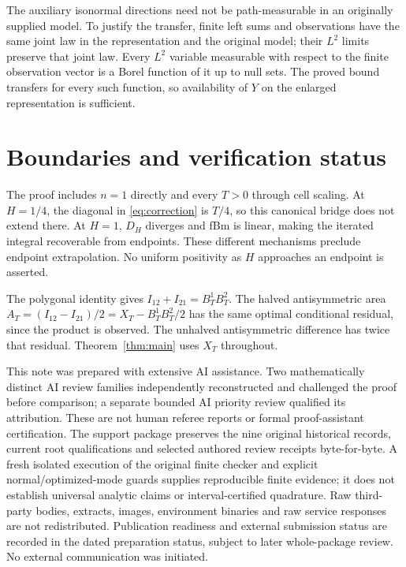 \documentclass[11pt]{article}
\begin{document}
The auxiliary isonormal directions need not be path-measurable in an originally supplied model. To justify the transfer, finite left sums and observations have the same joint law in the representation and the original model; their $L^2$ limits preserve that joint law. Every $L^2$ variable measurable with respect to the finite observation vector is a Borel function of it up to null sets. The proved bound transfers for every such function, so availability of $Y$ on the enlarged representation is sufficient.

\section{Boundaries and verification status}
The proof includes $n=1$ directly and every $T>0$ through cell scaling. At $H=1/4$, the diagonal in \eqref{eq:correction} is $T/4$, so this canonical bridge does not extend there. At $H=1$, $D_H$ diverges and fBm is linear, making the iterated integral recoverable from endpoints. These different mechanisms preclude endpoint extrapolation. No uniform positivity as $H$ approaches an endpoint is asserted.

The polygonal identity gives $I_{12}+I_{21}=B^1_TB^2_T$. The halved antisymmetric area $A_T=(I_{12}-I_{21})/2=X_T-B^1_TB^2_T/2$ has the same optimal conditional residual, since the product is observed. The unhalved antisymmetric difference has twice that residual. Theorem~\ref{thm:main} uses $X_T$ throughout.

This note was prepared with extensive AI assistance. Two mathematically distinct AI review families independently reconstructed and challenged the proof before comparison; a separate bounded AI priority review qualified its attribution. These are not human referee reports or formal proof-assistant certification. The support package preserves the nine original historical records, current root qualifications and selected authored review receipts byte-for-byte. A fresh isolated execution of the original finite checker and explicit normal/optimized-mode guards supplies reproducible finite evidence; it does not establish universal analytic claims or interval-certified quadrature. Raw third-party bodies, extracts, images, environment binaries and raw service responses are not redistributed. Publication readiness and external submission status are recorded in the dated preparation status, subject to later whole-package review. No external communication was initiated.
\end{document}
